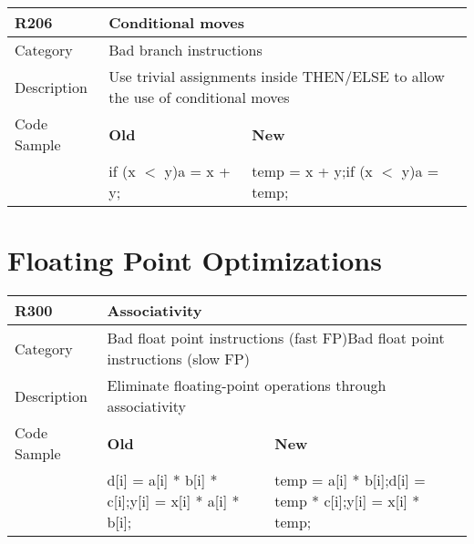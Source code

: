 \begin{tabular}{|p{0.9in}|p{2.0in}|p{2.0in}|} \hline
\textbf{R206}       & \multicolumn{2}{|p{4.0in}|}{\textbf{Conditional moves}} \\ \hline
Category            & \multicolumn{2}{|p{4.0in}|}{Bad branch instructions} \\ \hline
Description         & \multicolumn{2}{|p{4.0in}|}{Use trivial assignments inside THEN/ELSE to allow the use of conditional moves} \\ \hline
Code Sample         & \textbf{Old} & \textbf{New} \\ \hline
                    & if (x $<$ y)\newline   a = x + y;
                    & temp = x + y;\newline if (x $<$ y)\newline   a = temp;  \\ \hline
\end{tabular}

\section{Floating Point Optimizations}
\label{sec:Floating_Point_Optimizations}

\begin{tabular}{|p{0.9in}|p{2.0in}|p{2.0in}|} \hline
\textbf{R300}       & \multicolumn{2}{|p{4.0in}|}{\textbf{Associativity}} \\ \hline
Category            & \multicolumn{2}{|p{4.0in}|}{Bad float point instructions (fast FP)\newline Bad float point instructions (slow FP)} \\ \hline
Description         & \multicolumn{2}{|p{4.0in}|}{Eliminate floating-point operations through associativity} \\ \hline
Code Sample         & \textbf{Old} & \textbf{New} \\ \hline
                    & d[i] = a[i] * b[i] * c[i];\newline y[i] = x[i] * a[i] * b[i];
                    & temp = a[i] * b[i];\newline d[i] = temp * c[i];\newline y[i] = x[i] * temp;  \\ \hline
\end{tabular}

